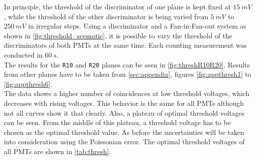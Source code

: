 In principle, the threshold of the discriminator of one plane is kept fixed at $\SI{15}{mV}$, while 
the threshold of the other discriminator is being varied from $\SI{5}{mV}$ to $\SI{250}{mV}$ in irregular steps. 
Using a discriminator and a Fan-in-Fan-out system as shown in \autoref{fig:threshold_scematic}, it is possible to vary
the threshold of the discriminators of both PMTs at the same time. Each counting measurement was conducted in $\SI{60}{s}$.\\ 
The results for the \texttt{R10} and \texttt{R20} planes can be seen in \autoref{fig:threshR10R20}.
Results from other planes have to be taken from \autoref{sec:appendix}, figures \autoref{fig:appthresh1} to \autoref{fig:appthresh6}.\\

The data shows a higher number of coincidences at low threshold voltages, which decreases with rising voltages.
This behavior is the same for all PMTs although not all curves show it that clearly.  
Also, a plateau of optimal threshold voltages can be seen. From the middle of this plateau, a threshold voltage 
has to be chosen as the optimal threshold value. As before the uncertainties will be taken 
into consideration using the Poissonian error. The optimal threshold voltages of all PMTs are shown in 
\autoref{tab:thresh}.

